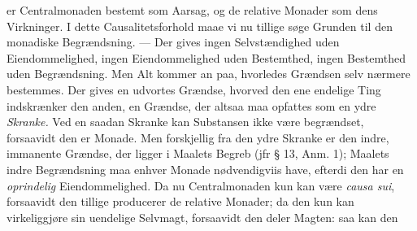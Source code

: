 \documentclass[12pt]{book}
\newcommand{\opage}[1]{\marginnote{\footnotesize\textit{[#1]}}}
\begin{document}
er Centralmonaden bestemt som Aarsag, og de relative Monader som dens Virkninger. I
dette Causalitetsforhold maae vi nu tillige søge Grunden til den monadiske
Begrændsning. --- Der gives ingen Selvstændighed uden Eiendommelighed, ingen
Eiendommelighed uden Bestemthed, ingen Bestemthed uden Begrændsning. Men Alt kommer an
paa, hvorledes Grændsen selv nærmere bestemmes. Der gives en udvortes Grændse, hvorved
den ene endelige Ting indskrænker den anden, en Grændse, der altsaa maa opfattes som en
ydre \emph{Skranke.} Ved en saadan Skranke kan Substansen ikke være begrændset,
forsaavidt den er Monade. Men forskjellig fra den ydre
\opage{172} %
%
%
Skranke er den indre, immanente Grændse, der ligger i Maalets Begreb (jfr § 13, Anm. 1);
Maalets indre Begrændsning maa enhver Monade nødvendigviis have, efterdi den har en
\emph{oprindelig} Eiendommelighed. Da nu Centralmonaden kun kan være
\textit{causa sui}, forsaavidt den tillige producerer de relative Monader; da den kun
kan virkeliggjøre sin uendelige Selvmagt, forsaavidt den deler Magten: saa kan den
\end{document}
